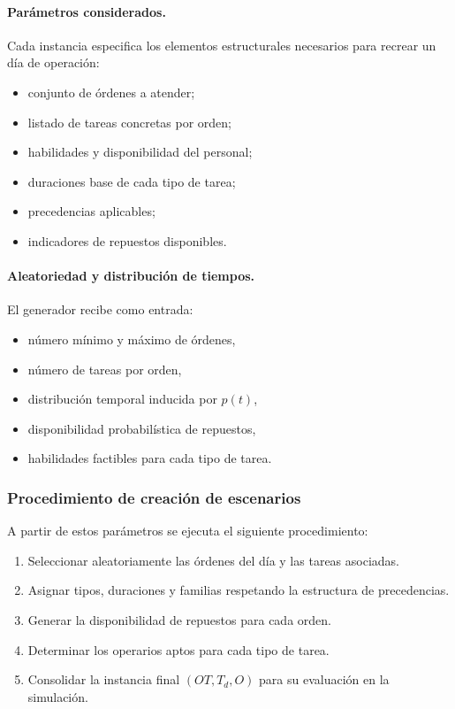 \paragraph{Parámetros considerados.} Cada instancia especifica los elementos estructurales necesarios para recrear un día de operación:
\begin{itemize}
    \item conjunto de órdenes a atender;
    \item listado de tareas concretas por orden;
    \item habilidades y disponibilidad del personal;
    \item duraciones base de cada tipo de tarea;
    \item precedencias aplicables;
    \item indicadores de repuestos disponibles.
\end{itemize}

\paragraph{Aleatoriedad y distribución de tiempos.} El generador recibe como entrada:
\begin{itemize}
    \item número mínimo y máximo de órdenes,
    \item número de tareas por orden,
    \item distribución temporal inducida por \(p(t)\),
    \item disponibilidad probabilística de repuestos,
    \item habilidades factibles para cada tipo de tarea.
\end{itemize}

\subsubsection{Procedimiento de creación de escenarios}
A partir de estos parámetros se ejecuta el siguiente procedimiento:
\begin{enumerate}
    \item Seleccionar aleatoriamente las órdenes del día y las tareas asociadas.
    \item Asignar tipos, duraciones y familias respetando la estructura de precedencias.
    \item Generar la disponibilidad de repuestos para cada orden.
    \item Determinar los operarios aptos para cada tipo de tarea.
    \item Consolidar la instancia final \((OT, T_d, O)\) para su evaluación en la simulación.
\end{enumerate}

